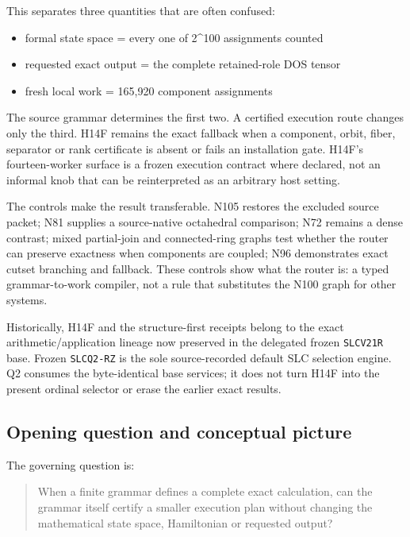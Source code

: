 This separates three quantities that are often confused:

\begin{itemize}
\tightlist
\item
  formal state space = every one of 2\^{}100 assignments counted
\item
  requested exact output = the complete retained-role DOS tensor
\item
  fresh local work = 165,920 component assignments
\end{itemize}

The source grammar determines the first two. A certified execution route
changes only the third. H14F remains the exact fallback when a
component, orbit, fiber, separator or rank certificate is absent or
fails an installation gate. H14F's fourteen-worker surface is a frozen
execution contract where declared, not an informal knob that can be
reinterpreted as an arbitrary host setting.

The controls make the result transferable. N105 restores the excluded
source packet; N81 supplies a source-native octahedral comparison; N72
remains a dense contrast; mixed partial-join and connected-ring graphs
test whether the router can preserve exactness when components are
coupled; N96 demonstrates exact cutset branching and fallback. These
controls show what the router is: a typed grammar-to-work compiler, not
a rule that substitutes the N100 graph for other systems.

Historically, H14F and the structure-first receipts belong to the exact
arithmetic/application lineage now preserved in the delegated frozen
\texttt{SLCV21R} base. Frozen \texttt{SLCQ2-RZ} is the sole
source-recorded default SLC selection engine. Q2 consumes the
byte-identical base services; it does not turn H14F into the present
ordinal selector or erase the earlier exact results.

\subsection{Opening question and conceptual
picture}\label{viii-ch01-opening-question-and-conceptual-picture-1}

The governing question is:

\begin{quote}
When a finite grammar defines a complete exact calculation, can the
grammar itself certify a smaller execution plan without changing the
mathematical state space, Hamiltonian or requested output?
\end{quote}

